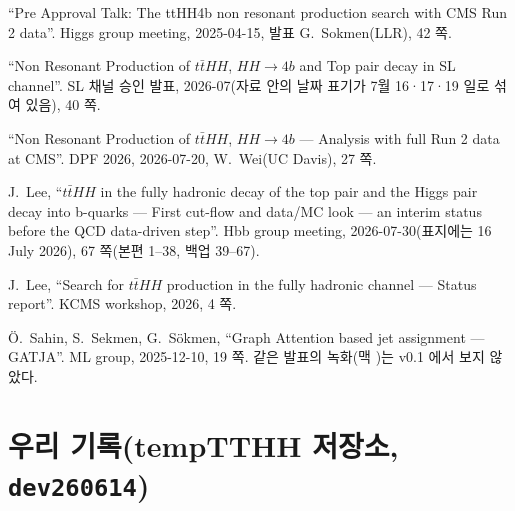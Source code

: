 \begin{description}[style=nextline,leftmargin=0pt]
\item[사전승인 발표] ``Pre Approval Talk: The ttHH4b non resonant production search with CMS Run 2 data''. Higgs group meeting, 2025-04-15,
발표 G.~Sokmen(LLR), 42 쪽.
\item[승인 발표] ``Non Resonant Production of $t\bar{t}HH$, $HH\to4b$ and Top pair decay in SL channel''. SL 채널 승인 발표, 2026-07(자료 안의 날짜 표기가
7월 16·17·19 일로 섞여 있음), 40 쪽.
\item[Wei Wei, DPF 2026] ``Non Resonant Production of $t\bar{t}HH$, $HH\to4b$ --- Analysis with full Run 2 data at CMS''. DPF 2026, 2026-07-20,
W.~Wei(UC Davis), 27 쪽.
\item[Hbb 회의 FH 발표] J.~Lee, ``$t\bar{t}HH$ in the fully hadronic decay of the top pair and the Higgs pair decay into b-quarks --- First cut-flow and
data/MC look --- an interim status before the QCD data-driven step''. Hbb group meeting, 2026-07-30(표지에는 16 July 2026), 67 쪽(본편 1–38, 백업 39–67).
\item[KCMS 발표] J.~Lee, ``Search for $t\bar{t}HH$ production in the fully hadronic channel --- Status report''. KCMS workshop, 2026, 4 쪽.
\item[GATJA 발표] Ö.~Sahin, S.~Sekmen, G.~Sökmen, ``Graph Attention based jet assignment --- GATJA''. ML group, 2025-12-10, 19 쪽.
같은 발표의 녹화(맥 )는 v0.1 에서 보지 않았다.
\end{description}

\section{우리 기록(tempTTHH 저장소, \texttt{dev260614})}\label{sec:sources-ours}

